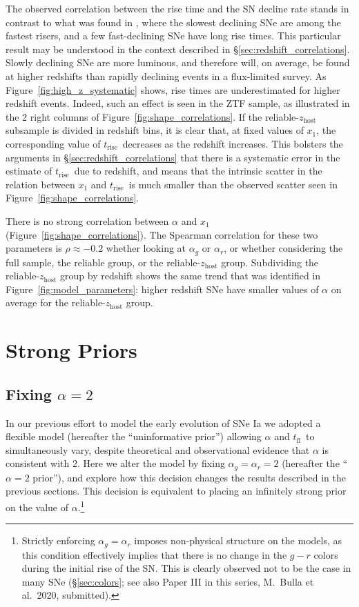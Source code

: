 \documentclass[twocolumn]{./aastex63}
\newcommand{\tfl}{$t_\mathrm{fl}$}
\newcommand{\trise}{$t_\mathrm{rise}$}
\begin{document}
The observed correlation between the rise time and the SN decline rate stands
in contrast to what was found in \citet{Hayden10}, where the slowest declining
SNe are among the fastest risers, and a few fast-declining SNe have long rise
times. This particular result may be understood in the context described in
\S\ref{sec:redshift_correlations}. Slowly declining SNe are more luminous, and
therefore will, on average, be found at higher redshifts than rapidly
declining events in a flux-limited survey. As
Figure~\ref{fig:high_z_systematic} shows, rise times are underestimated for
higher redshift events. Indeed, such an effect is seen in the ZTF sample, as
illustrated in the 2 right columns of Figure~\ref{fig:shape_correlations}. If
the reliable-$z_\mathrm{host}$ subsample is divided in redshift bins, it is
clear that, at fixed values of $x_1$, the corresponding value of \trise\
decreases as the redshift increases. This bolsters the arguments in
\S\ref{sec:redshift_correlations} that there is a systematic error in the
estimate of \trise\ due to redshift, and means that the intrinsic scatter in
the relation between $x_1$ and \trise\ is much smaller than the observed
scatter seen in Figure~\ref{fig:shape_correlations}.

There is no strong correlation between $\alpha$ and $x_1$
(Figure~\ref{fig:shape_correlations}). The Spearman correlation for these two
parameters is $\rho \approx -0.2$ whether looking at $\alpha_g$ or $\alpha_r$,
or whether considering the full sample, the reliable group, or the
reliable-$z_\mathrm{host}$ group. Subdividing the reliable-$z_\mathrm{host}$
group by redshift shows the same trend that was identified in
Figure~\ref{fig:model_parameters}: higher redshift SNe have smaller values of
$\alpha$ on average for the reliable-$z_\mathrm{host}$ group.

\section{Strong Priors}\label{sec:strong_priors}

\subsection{Fixing $\alpha = 2$}

In our previous effort to model the early evolution of SNe Ia we adopted a
flexible model (hereafter the ``uninformative prior'') allowing $\alpha$ and
\tfl\ to simultaneously vary, despite theoretical \citep{Arnett82,Riess99a} and
observational \citep{Conley06,Hayden10,Ganeshalingam11} evidence that $\alpha$
is consistent with $2$. Here we alter the model by fixing $\alpha_g = \alpha_r
= 2$ (hereafter the ``$\alpha = 2$ prior''), and explore how this decision
changes the results described in the previous sections. This decision is
equivalent to placing an infinitely strong prior on the value of
$\alpha$.\footnote{Strictly enforcing $\alpha_g = \alpha_r$ imposes
non-physical structure on the models, as this condition effectively implies
that there is no change in the $g - r$ colors during the initial rise of the
SN. This is clearly observed not to be the case in many SNe
(\S\ref{sec:colors}; see also Paper III in this series, M.~Bulla et al.\ 2020,
submitted).}
\end{document}
